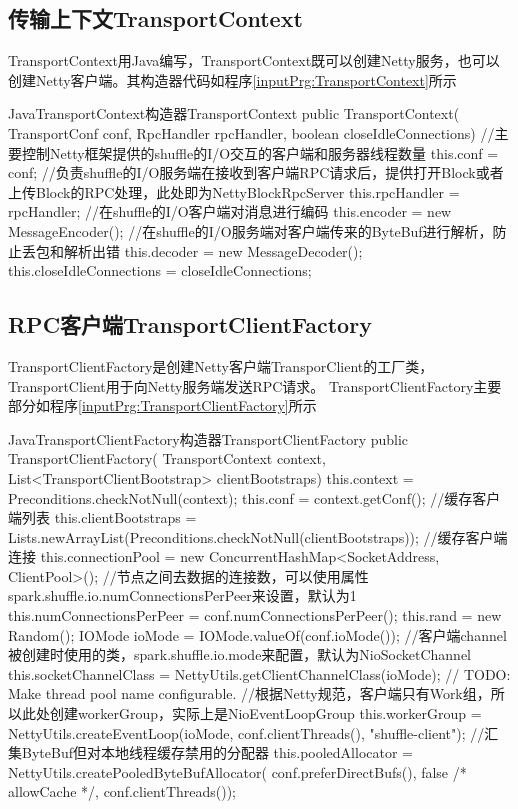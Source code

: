 \subsection{传输上下文TransportContext}
TransportContext用Java编写，TransportContext既可以创建Netty服务，也可以创建Netty客户端。其构造器代码如程序\ref{inputPrg:TransportContext}所示
\begin{codeInput}{Java}{TransportContext构造器}{TransportContext}
public TransportContext(
TransportConf conf,
RpcHandler rpcHandler,
boolean closeIdleConnections) {
  //主要控制Netty框架提供的shuffle的I/O交互的客户端和服务器线程数量
  this.conf = conf;
  //负责shuffle的I/O服务端在接收到客户端RPC请求后，提供打开Block或者上传Block的RPC处理，此处即为NettyBlockRpcServer
  this.rpcHandler = rpcHandler;
  //在shuffle的I/O客户端对消息进行编码
  this.encoder = new MessageEncoder();
  //在shuffle的I/O服务端对客户端传来的ByteBuf进行解析，防止丢包和解析出错
  this.decoder = new MessageDecoder();
  this.closeIdleConnections = closeIdleConnections;
}
\end{codeInput}
\subsection{RPC客户端TransportClientFactory}
TransportClientFactory是创建Netty客户端TransporClient的工厂类，TransportClient用于向Netty服务端发送RPC请求。
TransportClientFactory主要部分如程序\ref{inputPrg:TransportClientFactory}所示
\begin{codeInput}{Java}{TransportClientFactory构造器}{TransportClientFactory}
public TransportClientFactory(
TransportContext context,
List<TransportClientBootstrap> clientBootstraps) {
  this.context = Preconditions.checkNotNull(context);
  this.conf = context.getConf();
  //缓存客户端列表
  this.clientBootstraps = Lists.newArrayList(Preconditions.checkNotNull(clientBootstraps));
  //缓存客户端连接
  this.connectionPool = new ConcurrentHashMap<SocketAddress, ClientPool>();
  //节点之间去数据的连接数，可以使用属性spark.shuffle.io.numConnectionsPerPeer来设置，默认为1
  this.numConnectionsPerPeer = conf.numConnectionsPerPeer();
  this.rand = new Random();	
  IOMode ioMode = IOMode.valueOf(conf.ioMode());
  //客户端channel被创建时使用的类，spark.shuffle.io.mode来配置，默认为NioSocketChannel
  this.socketChannelClass = NettyUtils.getClientChannelClass(ioMode);
  // TODO: Make thread pool name configurable.
  //根据Netty规范，客户端只有Work组，所以此处创建workerGroup，实际上是NioEventLoopGroup
  this.workerGroup = NettyUtils.createEventLoop(ioMode, conf.clientThreads(), "shuffle-client");
  //汇集ByteBuf但对本地线程缓存禁用的分配器
  this.pooledAllocator = NettyUtils.createPooledByteBufAllocator(
  conf.preferDirectBufs(), false /* allowCache */, conf.clientThreads());
}
\end{codeInput}
